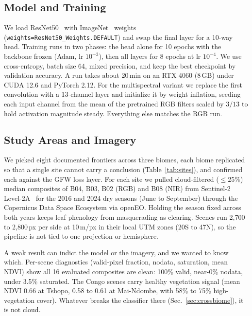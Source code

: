 \documentclass[journal]{IEEEtran}
\begin{document}
\subsection{Model and Training}
We load ResNet50~\cite{he2016} with ImageNet~\cite{deng2009} weights
(\texttt{weights=ResNet50\_Weights.DEFAULT}) and swap the final layer for a 10-way
head. Training runs in two phases: the head alone for 10 epochs with the backbone
frozen (Adam, lr $10^{-3}$), then all layers for 8 epochs at lr $10^{-4}$. We use
cross-entropy, batch size 64, mixed precision, and keep the best checkpoint by
validation accuracy. A run takes about 20\,min on an RTX 4060 (8\,GB) under CUDA
12.6 and PyTorch 2.12. For the multispectral variant we replace the first
convolution with a 13-channel layer and initialize it by weight inflation, seeding
each input channel from the mean of the pretrained RGB filters scaled by $3/13$ to
hold activation magnitude steady. Everything else matches the RGB run.

\subsection{Study Areas and Imagery}
We picked eight documented frontiers across three biomes, each biome replicated so
that a single site cannot carry a conclusion (Table~\ref{tab:sites}), and confirmed
each against the GFW loss layer. For each site we pulled cloud-filtered
($\leq$25\%) median composites of B04, B03, B02 (RGB) and B08 (NIR) from Sentinel-2
Level-2A~\cite{drusch2012} for the 2016 and 2024 dry seasons (June to September)
through the Copernicus Data Space Ecosystem via openEO. Holding the season fixed
across both years keeps leaf phenology from masquerading as clearing. Scenes run
2{,}700 to 2{,}800\,px per side at 10\,m/px in their local UTM zones (20S to 47N),
so the pipeline is not tied to one projection or hemisphere.

A weak result can indict the model or the imagery, and we wanted to know which.
Per-scene diagnostics (valid-pixel fraction, nodata, saturation, mean NDVI) show
all 16 evaluated composites are clean: 100\% valid, near-0\% nodata, under 3.5\%
saturated. The Congo scenes carry healthy vegetation signal (mean NDVI 0.66 at
Tshopo, 0.58 to 0.61 at Mai-Ndombe, with 58\% to 75\% high-vegetation cover).
Whatever breaks the classifier there (Sec.~\ref{sec:crossbiome}), it is not cloud.
\end{document}
